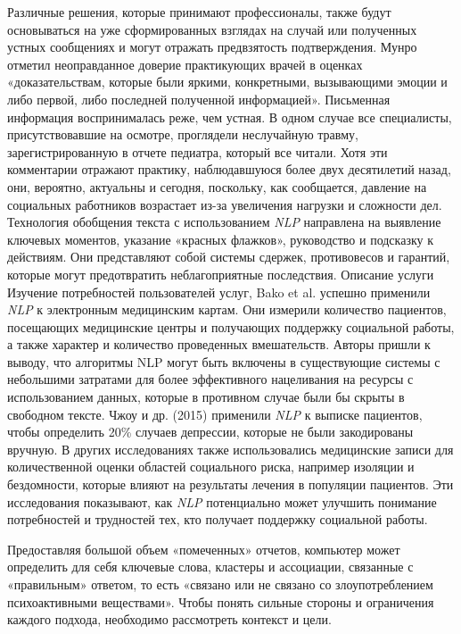 \documentclass[a4paper,10pt]{article}
\begin{document}
    Различные решения, которые принимают профессионалы, также будут основываться на уже сформированных взглядах на случай или полученных устных сообщениях и могут отражать предвзятость подтверждения. 
    Мунро отметил неоправданное доверие практикующих врачей в оценках «доказательствам, которые были яркими, конкретными, вызывающими эмоции и либо первой, либо последней полученной информацией». 
    Письменная информация воспринималась реже, чем устная. 
    В одном случае все специалисты, присутствовавшие на осмотре, проглядели неслучайную травму, зарегистрированную в отчете педиатра, который все читали. 
    Хотя эти комментарии отражают практику, наблюдавшуюся более двух десятилетий назад, они, вероятно, актуальны и сегодня, поскольку, как сообщается, давление на социальных работников возрастает из-за увеличения нагрузки и сложности дел. 
    Технология обобщения текста с использованием \textit{NLP} направлена на выявление ключевых моментов, указание «красных флажков», руководство и подсказку к действиям. 
    Они представляют собой системы сдержек, противовесов и гарантий, которые могут предотвратить неблагоприятные последствия. 
    Описание услуги Изучение потребностей пользователей услуг, Bako et al. успешно применили \textit{NLP} к электронным медицинским картам. 
    Они измерили количество пациентов, посещающих медицинские центры и получающих поддержку социальной работы, а также характер и количество проведенных вмешательств. 
    Авторы пришли к выводу, что алгоритмы NLP могут быть включены в существующие системы с небольшими затратами для более эффективного нацеливания на ресурсы с использованием данных, которые в противном случае были бы скрыты в свободном тексте. 
    Чжоу и др. (2015) применили \textit{NLP} к выписке пациентов, чтобы определить 20\% случаев депрессии, которые не были закодированы вручную. 
    В других исследованиях также использовались медицинские записи для количественной оценки областей социального риска, например изоляции и бездомности, которые влияют на результаты лечения в популяции пациентов. 
    Эти исследования показывают, как \textit{NLP} потенциально может улучшить понимание потребностей и трудностей тех, кто получает поддержку социальной работы.
    \par\hrulefill\par
    Предоставляя большой объем «помеченных» отчетов, компьютер может определить для себя ключевые слова, кластеры и ассоциации, связанные с «правильным» ответом, то есть «связано или не связано со злоупотреблением психоактивными веществами». 
    Чтобы понять сильные стороны и ограничения каждого подхода, необходимо рассмотреть контекст и цели. 
\end{document}
